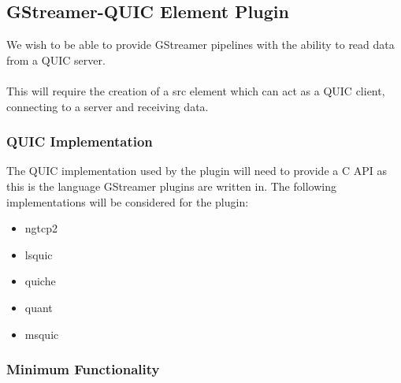 \documentclass[11pt]{article}
\begin{document}
\subsection{GStreamer-QUIC Element Plugin}

We wish to be able to provide GStreamer pipelines with the ability to read data from a QUIC server.
\\\\
This will require the creation of a src element which can act as a QUIC client, connecting to a server and receiving data. 

\subsubsection{QUIC Implementation}

The QUIC implementation used by the plugin will need to provide a C API as this is the language GStreamer plugins are written in. The following implementations will be considered for the plugin:


\begin{itemize}
    \item ngtcp2
    \item lsquic
    \item quiche
    \item quant
    \item msquic
\end{itemize}


\subsubsection{Minimum Functionality}

\end{document}
